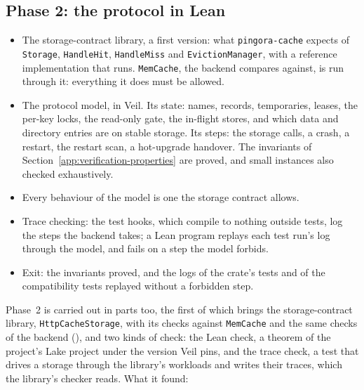 \subsection*{Phase 2: the protocol in Lean}
\begin{itemize}
  \item The storage-contract library, a first version: what
    \texttt{pingora-cache} expects of \texttt{Storage}, \texttt{HandleHit},
    \texttt{HandleMiss} and \texttt{EvictionManager}, with a reference
    implementation that runs. \texttt{MemCache}, the backend
     compares against, is run through it:
    everything it does must be allowed.
  \item The protocol model, in Veil. Its state: names, records, temporaries,
    leases, the per-key locks, the read-only gate, the in-flight stores, and
    which data and directory entries are on stable storage. Its steps: the
    storage calls, a crash, a restart, the restart scan, a hot-upgrade
    handover. The invariants of Section~\ref{app:verification-properties}
    are proved, and small instances also checked exhaustively.
  \item Every behaviour of the model is one the storage contract allows.
  \item Trace checking: the test hooks, which compile to nothing outside
    tests, log the steps the backend takes; a Lean program replays each test
    run's log through the model, and fails on a step the model forbids.
  \item Exit: the invariants proved, and the logs of the crate's tests and
    of the compatibility tests replayed without a forbidden step.
\end{itemize}
Phase~2 is carried out in parts too, the first of which brings the
storage-contract library, \texttt{HttpCacheStorage}, with its checks against
\texttt{MemCache} and the same checks of the backend
(), and two kinds of check: the Lean
check, a theorem of the project's Lake project under the version Veil pins,
and the trace check, a test that drives a storage through the library's
workloads and writes their traces, which the library's checker reads. What
it found:
